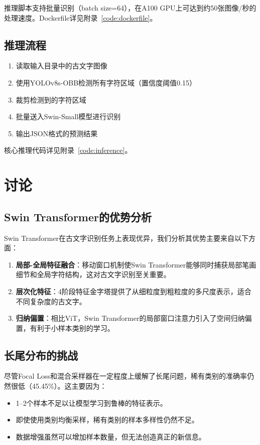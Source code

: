 \documentclass[12pt,a4paper]{article}
\begin{document}
推理脚本支持批量识别（batch size=64），在A100 GPU上可达到约50张图像/秒的处理速度。Dockerfile详见附录~\ref{code:dockerfile}。

\subsection{推理流程}

\begin{enumerate}
    \item 读取输入目录中的古文字图像
    \item 使用YOLOv8s-OBB检测所有字符区域（置信度阈值0.15）
    \item 裁剪检测到的字符区域
    \item 批量送入Swin-Small模型进行识别
    \item 输出JSON格式的预测结果
\end{enumerate}

核心推理代码详见附录~\ref{code:inference}。

\section{讨论}

\subsection{Swin Transformer的优势分析}

Swin Transformer在古文字识别任务上表现优异，我们分析其优势主要来自以下方面：

\begin{enumerate}
    \item \textbf{局部-全局特征融合}：移动窗口机制使Swin Transformer能够同时捕获局部笔画细节和全局字符结构，这对古文字识别至关重要。
    \item \textbf{层次化特征}：4阶段特征金字塔提供了从细粒度到粗粒度的多尺度表示，适合不同复杂度的古文字。
    \item \textbf{归纳偏置}：相比ViT，Swin Transformer的局部窗口注意力引入了空间归纳偏置，有利于小样本类别的学习。
\end{enumerate}

\subsection{长尾分布的挑战}

尽管Focal Loss和混合采样器在一定程度上缓解了长尾问题，稀有类别的准确率仍然很低（45.45\%）。这主要因为：
\begin{itemize}
    \item 1--2个样本不足以让模型学习到鲁棒的特征表示。
    \item 即使使用类别均衡采样，稀有类别的样本多样性仍然不足。
    \item 数据增强虽然可以增加样本数量，但无法创造真正的新信息。
\end{itemize}
\end{document}
